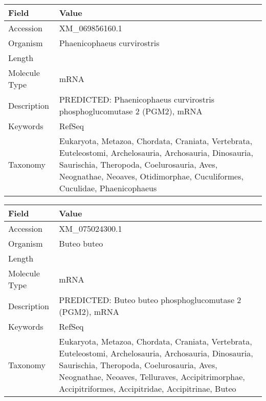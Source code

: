 \documentclass[10pt]{article}
\begin{document}
\vspace{1em}
{\footnotesize
\begin{longtable}{>{\raggedright\arraybackslash}p{4.5cm} >{\raggedright\arraybackslash}p{11.5cm}}
\textbf{Field} & \textbf{Value} \\
\hline
Accession & XM\_069856160.1 \\
Organism & Phaenicophaeus curvirostris \\
Length & 2146 \\
Molecule Type & mRNA \\
Description & PREDICTED: Phaenicophaeus curvirostris phosphoglucomutase 2 (PGM2), mRNA \\
Keywords & RefSeq \\
Taxonomy & Eukaryota, Metazoa, Chordata, Craniata, Vertebrata, Euteleostomi, Archelosauria, Archosauria, Dinosauria, Saurischia, Theropoda, Coelurosauria, Aves, Neognathae, Neoaves, Otidimorphae, Cuculiformes, Cuculidae, Phaenicophaeus \\
\end{longtable}
}

\vspace{1em}
{\footnotesize
\begin{longtable}{>{\raggedright\arraybackslash}p{4.5cm} >{\raggedright\arraybackslash}p{11.5cm}}
\textbf{Field} & \textbf{Value} \\
\hline
Accession & XM\_075024300.1 \\
Organism & Buteo buteo \\
Length & 2705 \\
Molecule Type & mRNA \\
Description & PREDICTED: Buteo buteo phosphoglucomutase 2 (PGM2), mRNA \\
Keywords & RefSeq \\
Taxonomy & Eukaryota, Metazoa, Chordata, Craniata, Vertebrata, Euteleostomi, Archelosauria, Archosauria, Dinosauria, Saurischia, Theropoda, Coelurosauria, Aves, Neognathae, Neoaves, Telluraves, Accipitrimorphae, Accipitriformes, Accipitridae, Accipitrinae, Buteo \\
\end{longtable}
}
\end{document}
